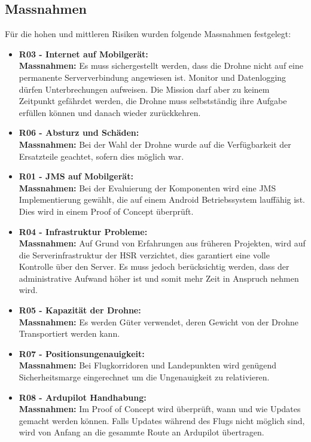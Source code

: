 \subsection{Massnahmen}
Für die hohen und mittleren Risiken wurden folgende Massnahmen festgelegt:
\begin{itemize}
	\item{\textbf{R03 - Internet auf Mobilgerät:} \\
	\textbf{Massnahmen:} Es muss sichergestellt werden, dass die Drohne nicht auf eine permanente Serververbindung angewiesen ist. Monitor und Datenlogging dürfen Unterbrechungen aufweisen. Die Mission darf aber zu keinem Zeitpunkt gefährdet werden, die Drohne muss selbstständig ihre Aufgabe erfüllen können und danach wieder zurückkehren.}
	
	\item{\textbf{R06 - Absturz und Schäden:} \\
	\textbf{Massnahmen:} Bei der Wahl der Drohne wurde auf die Verfügbarkeit der Ersatzteile geachtet, sofern dies möglich war. }

	\item{\textbf{R01 - JMS auf Mobilgerät:} \\
	\textbf{Massnahmen:} Bei der Evaluierung der Komponenten wird eine JMS Implementierung gewählt, die auf einem Android Betriebssystem lauffähig ist. Dies wird in einem Proof of Concept überprüft.}
	
	\item{\textbf{R04 - Infrastruktur Probleme:} \\
	\textbf{Massnahmen:} Auf Grund von Erfahrungen aus früheren Projekten, wird auf die Serverinfrastruktur der HSR verzichtet, dies garantiert eine volle Kontrolle über den Server. Es muss jedoch berücksichtig werden, dass der administrative Aufwand höher ist und somit mehr Zeit in Anspruch nehmen wird.}
	
	\item{\textbf{R05 - Kapazität der Drohne:} \\
	\textbf{Massnahmen:} Es werden Güter verwendet, deren Gewicht von der Drohne Transportiert werden kann.}	
	
	\item{\textbf{R07 - Positionsungenauigkeit:} \\
	\textbf{Massnahmen:} Bei Flugkorridoren und Landepunkten wird genügend Sicherheitsmarge eingerechnet um die Ungenauigkeit zu relativieren.}
	
	\item{\textbf{R08 - Ardupilot Handhabung:} \\
	\textbf{Massnahmen:}  Im Proof of Concept wird überprüft, wann und wie Updates gemacht werden können. Falls Updates während des Flugs nicht möglich sind, wird von Anfang an die gesammte Route an Ardupilot übertragen.}
	

\end{itemize}
